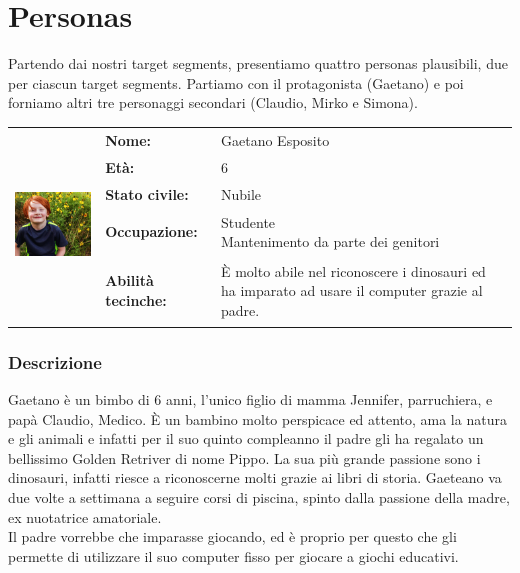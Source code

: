 \documentclass[../Report.tex]{subfiles}
\begin{document}
    \section{Personas}
    Partendo dai nostri target segments, presentiamo quattro personas plausibili, due per ciascun target segments. Partiamo con il protagonista (Gaetano) e poi forniamo altri tre personaggi secondari (Claudio, Mirko e Simona).\\

    \begin{table}[H]
        \begin{tabular}{|c|l|p{7cm}|}
            \hline
            \multirow{5}{*}{\includegraphics[width=5cm, height=5cm]{Gaetano.jpg}} 
                & \textbf{Nome:} & Gaetano Esposito\\ \cmidrule{2-3}
            & \textbf{Età:} & 6 \\ \cmidrule{2-3}
            & \textbf{Stato civile:} & Nubile \\ \cmidrule{2-3}
            & \textbf{Occupazione:} & \makecell{Studente \\ Mantenimento da parte dei genitori} \\ \cmidrule{2-3}
            & \textbf{Abilità tecinche:} &  È molto abile nel riconoscere i dinosauri ed ha imparato ad usare il computer grazie al padre.\\
            \hline
        \end{tabular}
    \end{table}

    \subsubsection{Descrizione}
    Gaetano è un bimbo di 6 anni, l'unico figlio di mamma Jennifer, parruchiera, e papà Claudio, Medico. È un bambino molto perspicace ed attento, ama la natura e gli animali e infatti per il suo quinto compleanno il padre gli ha regalato un bellissimo Golden Retriver di nome Pippo. La sua più grande passione sono i dinosauri, infatti riesce a riconoscerne molti grazie ai libri di storia.
    Gaeteano va due volte a settimana a seguire corsi di piscina, spinto dalla passione della madre, ex nuotatrice amatoriale.\\
    Il padre vorrebbe che imparasse giocando, ed è proprio per questo che gli permette di utilizzare il suo computer fisso per giocare a giochi educativi.
\end{document}
